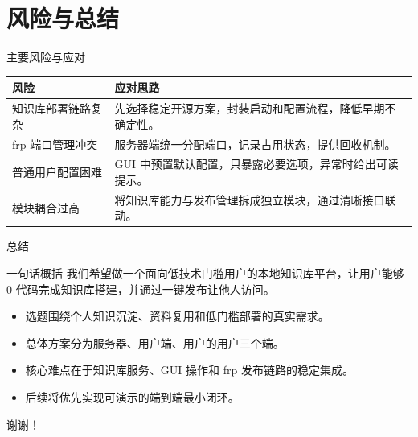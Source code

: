 \documentclass[aspectratio=169]{beamer}
\begin{document}
\section{风险与总结}

\begin{frame}{主要风险与应对}
    \small
    \begin{tabularx}{\textwidth}{>{\raggedright\arraybackslash}p{}X}
        \toprule
        \textbf{风险} & \textbf{应对思路} \\
        \midrule
        知识库部署链路复杂 & 先选择稳定开源方案，封装启动和配置流程，降低早期不确定性。 \\
        frp 端口管理冲突 & 服务器端统一分配端口，记录占用状态，提供回收机制。 \\
        普通用户配置困难 & GUI 中预置默认配置，只暴露必要选项，异常时给出可读提示。 \\
        模块耦合过高 & 将知识库能力与发布管理拆成独立模块，通过清晰接口联动。 \\
        \bottomrule
    \end{tabularx}
\end{frame}

\begin{frame}{总结}
    \begin{block}{一句话概括}
        我们希望做一个面向低技术门槛用户的本地知识库平台，让用户能够 0 代码完成知识库搭建，并通过一键发布让他人访问。
    \end{block}

    \begin{itemize}
        \item 选题围绕个人知识沉淀、资料复用和低门槛部署的真实需求。
        \item 总体方案分为服务器、用户端、用户的用户三个端。
        \item 核心难点在于知识库服务、GUI 操作和 frp 发布链路的稳定集成。
        \item 后续将优先实现可演示的端到端最小闭环。
    \end{itemize}
\end{frame}

\begin{frame}
    \centering
    \Huge 谢谢！
\end{frame}
\end{document}
